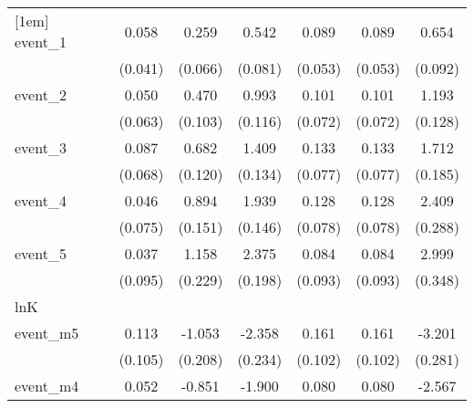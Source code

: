 {\begin{tabular}{l*{6}{c}}
[1em]
event\_1     &       0.058         &       0.259\sym{***}&       0.542\sym{***}&       0.089         &       0.089         &       0.654\sym{***}\\
            &     (0.041)         &     (0.066)         &     (0.081)         &     (0.053)         &     (0.053)         &     (0.092)         \\
[1em]
event\_2     &       0.050         &       0.470\sym{***}&       0.993\sym{***}&       0.101         &       0.101         &       1.193\sym{***}\\
            &     (0.063)         &     (0.103)         &     (0.116)         &     (0.072)         &     (0.072)         &     (0.128)         \\
[1em]
event\_3     &       0.087         &       0.682\sym{***}&       1.409\sym{***}&       0.133         &       0.133         &       1.712\sym{***}\\
            &     (0.068)         &     (0.120)         &     (0.134)         &     (0.077)         &     (0.077)         &     (0.185)         \\
[1em]
event\_4     &       0.046         &       0.894\sym{***}&       1.939\sym{***}&       0.128         &       0.128         &       2.409\sym{***}\\
            &     (0.075)         &     (0.151)         &     (0.146)         &     (0.078)         &     (0.078)         &     (0.288)         \\
[1em]
event\_5     &       0.037         &       1.158\sym{***}&       2.375\sym{***}&       0.084         &       0.084         &       2.999\sym{***}\\
            &     (0.095)         &     (0.229)         &     (0.198)         &     (0.093)         &     (0.093)         &     (0.348)         \\
\hline
lnK         &                     &                     &                     &                     &                     &                     \\
event\_m5    &       0.113         &      -1.053\sym{***}&      -2.358\sym{***}&       0.161         &       0.161         &      -3.201\sym{***}\\
            &     (0.105)         &     (0.208)         &     (0.234)         &     (0.102)         &     (0.102)         &     (0.281)         \\
[1em]
event\_m4    &       0.052         &      -0.851\sym{***}&      -1.900\sym{***}&       0.080         &       0.080         &      -2.567\sym{***}\\

\end{tabular}}
